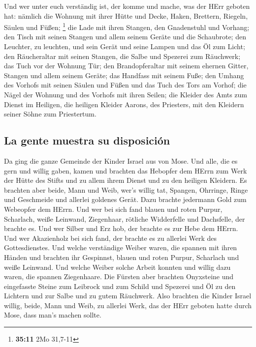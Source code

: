  Und wer unter euch verständig ist, der komme und mache,
was der HErr geboten hat:  nämlich die Wohnung mit ihrer
Hütte und Decke, Haken, Brettern, Riegeln, Säulen und Füßen; \footnote{\textbf{35:11}
  2Mo 31,7-11}  die Lade mit ihren Stangen, den
Gnadenstuhl und Vorhang;  den Tisch mit seinen Stangen
und allem seinem Geräte und die Schaubrote;  den
Leuchter, zu leuchten, und sein Gerät und seine Lampen und das Öl zum
Licht;  den Räucheraltar mit seinen Stangen, die Salbe
und Spezerei zum Räuchwerk; das Tuch vor der Wohnung Tür;
 den Brandopferaltar mit seinem ehernen Gitter, Stangen
und allem seinem Geräte; das Handfass mit seinem Fuße; 
den Umhang des Vorhofs mit seinen Säulen und Füßen und das Tuch des Tors
am Vorhof;  die Nägel der Wohnung und des Vorhofs mit
ihren Seilen;  die Kleider des Amts zum Dienst im
Heiligen, die heiligen Kleider Aarons, des Priesters, mit den Kleidern
seiner Söhne zum Priestertum.

\hypertarget{la-gente-muestra-su-disposiciuxf3n}{%
\subsection{La gente muestra su
disposición}\label{la-gente-muestra-su-disposiciuxf3n}}

 Da ging die ganze Gemeinde der Kinder Israel aus von
Mose.  Und alle, die es gern und willig gaben, kamen und
brachten das Hebopfer dem HErrn zum Werk der Hütte des Stifts und zu
allem ihrem Dienst und zu den heiligen Kleidern.  Es
brachten aber beide, Mann und Weib, wer's willig tat, Spangen, Ohrringe,
Ringe und Geschmeide und allerlei goldenes Gerät. Dazu brachte jedermann
Gold zum Webeopfer dem HErrn.  Und wer bei sich fand
blauen und roten Purpur, Scharlach, weiße Leinwand, Ziegenhaar, rötliche
Widderfelle und Dachsfelle, der brachte es.  Und wer
Silber und Erz hob, der brachte es zur Hebe dem HErrn. Und wer
Akazienholz bei sich fand, der brachte es zu allerlei Werk des
Gottesdienstes.  Und welche verständige Weiber waren, die
spannen mit ihren Händen und brachten ihr Gespinnst, blauen und roten
Purpur, Scharlach und weiße Leinwand.  Und welche Weiber
solche Arbeit konnten und willig dazu waren, die spannen Ziegenhaare.
 Die Fürsten aber brachten Onyxsteine und eingefasste
Steine zum Leibrock und zum Schild  und Spezerei und Öl
zu den Lichtern und zur Salbe und zu gutem Räuchwerk. 
Also brachten die Kinder Israel willig, beide, Mann und Weib, zu
allerlei Werk, das der HErr geboten hatte durch Mose, dass man's machen
sollte.

